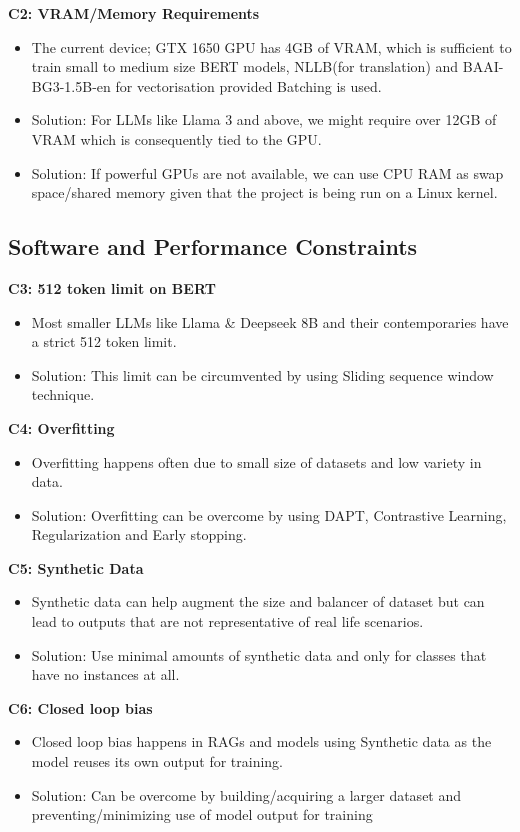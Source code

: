 \textbf{C2: VRAM/Memory Requirements}
\begin{itemize}
    \item The current device; GTX 1650 GPU has 4GB of VRAM, which is sufficient to train small to medium size BERT models, NLLB(for translation) and BAAI-BG3-1.5B-en for vectorisation provided Batching is used.
    \item Solution: For LLMs like Llama 3 and above, we might require over 12GB of VRAM which is consequently tied to the GPU.
    \item Solution: If powerful GPUs are not available, we can use CPU RAM as swap space/shared memory given that the project is being run on a Linux kernel.
\end{itemize}




\subsection{Software and Performance Constraints}
\textbf{C3: 512 token limit on BERT}
\begin{itemize}
    \item Most smaller LLMs like Llama \& Deepseek 8B  and their contemporaries have a strict 512 token limit.
    \item Solution: This limit can be circumvented by using Sliding sequence window technique.
\end{itemize}

\textbf{C4: Overfitting}
\begin{itemize}
    \item Overfitting happens often due to small size of datasets and low variety in data.
    \item Solution: Overfitting can be overcome by using DAPT, Contrastive Learning, Regularization and Early stopping.
\end{itemize}

\textbf{C5: Synthetic Data}
\begin{itemize}
	\item Synthetic data can help augment the size and balancer of dataset but can lead to outputs that are not representative of real life scenarios.
	\item Solution: Use minimal amounts of synthetic data and only for classes that have no instances at all.
\end{itemize}

\textbf{C6: Closed loop bias}
\begin{itemize}
	\item Closed loop bias happens in RAGs and models using Synthetic data as the model reuses its own output for training.
	\item Solution: Can be overcome by building/acquiring a larger dataset and preventing/minimizing use of model output for training
\end{itemize}

